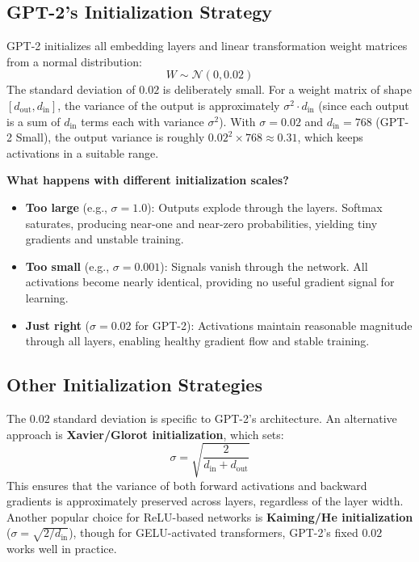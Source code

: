 \subsection{GPT-2's Initialization Strategy}

GPT-2 initializes all embedding layers and linear transformation weight matrices from a normal distribution:
\[
  W \sim \mathcal{N}(0, 0.02)
\]
The standard deviation of $0.02$ is deliberately small. For a weight matrix of shape $[d_{\text{out}}, d_{\text{in}}]$, the variance of the output is approximately $\sigma^2 \cdot d_{\text{in}}$ (since each output is a sum of $d_{\text{in}}$ terms each with variance $\sigma^2$). With $\sigma = 0.02$ and $d_{\text{in}} = 768$ (GPT-2 Small), the output variance is roughly $0.02^2 \times 768 \approx 0.31$, which keeps activations in a suitable range.

\begin{keyconcept}
  \textbf{What happens with different initialization scales?}
  \begin{itemize}
    \item \textbf{Too large} (e.g., $\sigma = 1.0$): Outputs explode through the layers. Softmax saturates, producing near-one and near-zero probabilities, yielding tiny gradients and unstable training.
    \item \textbf{Too small} (e.g., $\sigma = 0.001$): Signals vanish through the network. All activations become nearly identical, providing no useful gradient signal for learning.
    \item \textbf{Just right} ($\sigma = 0.02$ for GPT-2): Activations maintain reasonable magnitude through all layers, enabling healthy gradient flow and stable training.
  \end{itemize}
\end{keyconcept}

\subsection{Other Initialization Strategies}

The $0.02$ standard deviation is specific to GPT-2's architecture. An alternative approach is \textbf{Xavier/Glorot initialization}, which sets:
\[
  \sigma = \sqrt{\frac{2}{d_{\text{in}} + d_{\text{out}}}}
\]
This ensures that the variance of both forward activations and backward gradients is approximately preserved across layers, regardless of the layer width. Another popular choice for ReLU-based networks is \textbf{Kaiming/He initialization} ($\sigma = \sqrt{2 / d_{\text{in}}}$), though for GELU-activated transformers, GPT-2's fixed $0.02$ works well in practice.

